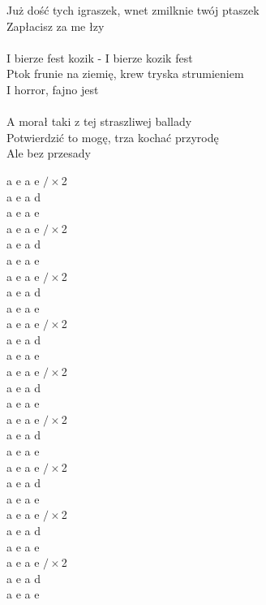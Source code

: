 \documentclass[a5paper, 10pt]{book}
\begin{document}
\begin{minipage}[t]{0.8\textwidth}
  Już dość tych igraszek, wnet zmilknie twój ptaszek\\
  Zapłacisz za me łzy\\
  \\
  I bierze fest kozik - I bierze kozik fest\\
  Ptok frunie na ziemię, krew tryska strumieniem\\
  I horror, fajno jest\\
  \\
  A morał taki z tej straszliwej ballady\\
  Potwierdzić to mogę, trza kochać przyrodę\\
  Ale bez przesady\\
\end{minipage}
\begin{minipage}[t]{0.2\textwidth}
  a e a e $/\times$2\\
  a e a d\\
  a e a e\\

  a e a e $/\times$2\\
  a e a d\\
  a e a e\\

  a e a e $/\times$2\\
  a e a d\\
  a e a e\\

  a e a e $/\times$2\\
  a e a d\\
  a e a e\\

  a e a e $/\times$2\\
  a e a d\\
  a e a e\\

  a e a e $/\times$2\\
  a e a d\\
  a e a e\\

  a e a e $/\times$2\\
  a e a d\\
  a e a e\\

  a e a e $/\times$2\\
  a e a d\\
  a e a e\\

  a e a e $/\times$2\\
  a e a d\\
  a e a e\\
\end{minipage}
\end{document}
